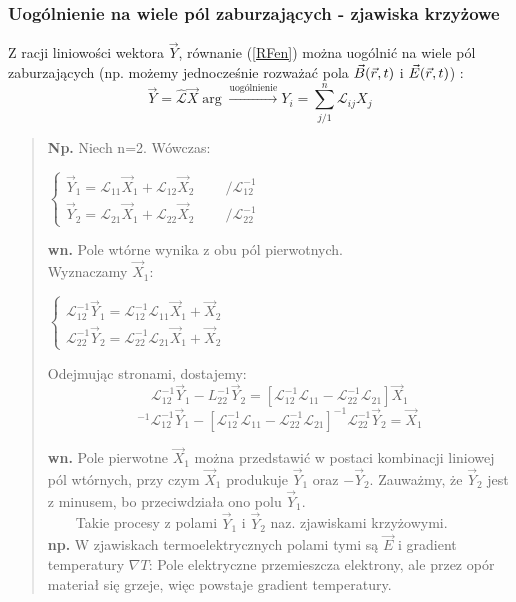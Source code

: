 \subsubsection{Uogólnienie na wiele pól zaburzających - zjawiska krzyżowe}
Z racji liniowości wektora $\vec{Y}$, równanie (\ref{RFen}) można uogólnić na wiele pól zaburzających (np. możemy jednocześnie rozważać pola $\vec{B}(\vec{r},t)$ i $\vec{E}(\vec{r},t)$) :
\begin{equation} \vec{Y}=\hat{\mathcal{L}}\vec{X} \arg 
\stackrel{\text{uogólnienie}}{\longrightarrow}  {Y}_i=\sum_{j/1}^n \mathcal{L}_{ij} X_j \end{equation}
\begin{verse} \textbf{Np.} Niech n=2. Wówczas:
\begin{center} 
$\begin{cases} \vec{Y}_1=\mathcal{L}_{11}\vec{X}_1+\mathcal{L}_{12}\vec{X}_2 ~~~~~~~~~~/\mathcal{L}_{12}^{-1}\\ \vec{Y}_2=\mathcal{L}_{21}\vec{X}_1+\mathcal{L}_{22}\vec{X}_2 ~~~~~~~~~~/\mathcal{L}_{22}^{-1}
\end{cases}$
\end{center}

\textbf{wn.} Pole wtórne wynika z obu pól pierwotnych.\\
Wyznaczamy $\vec{X}_1$:
\begin{center}
$\begin{cases} \mathcal{L}_{12}^{-1}\vec{Y}_1=\mathcal{L}_{12}^{-1}\mathcal{L}_{11}\vec{X}_1+\vec{X}_2 \\ \mathcal{L}_{22}^{-1}\vec{Y}_2=\mathcal{L}_{22}^{-1}\mathcal{L}_{21}\vec{X}_1+\vec{X}_2 
\end{cases}$
\end{center}
Odejmując stronami, dostajemy:
\begin{equation} \mathcal{L}_{12}^{-1}\vec{Y}_1 - {L}_{22}^{-1}\vec{Y}_2 = [\mathcal{L}_{12}^{-1}\mathcal{L}_{11} - \mathcal{L}_{22}^{-1}\mathcal{L}_{21}]\vec{X}_1 \nonumber \end{equation}
\begin{equation} 
 [\mathcal{L}_{12}^{-1}\mathcal{L}_{11}-\mathcal{L}_{22}^{-1}\mathcal{L}_{21}]^{-1} \mathcal{L}_{12}^{-1}\vec{Y}_1 -   
 [\mathcal{L}_{12}^{-1}\mathcal{L}_{11} - \mathcal{L}_{22}^{-1}\mathcal{L}_{21}]^{-1} \mathcal{L}_{22}^{-1}\vec{Y}_2 =\vec{X}_1  \nonumber \end{equation}
 
\textbf{wn.} Pole pierwotne $\vec{X}_1$ można przedstawić w postaci kombinacji liniowej pól wtórnych, przy czym $\vec{X}_1$ produkuje $\vec{Y}_1$ oraz $-\vec{Y}_2$. Zauważmy, że $\vec{Y}_2$ jest z minusem, bo przeciwdziała ono polu $\vec{Y}_1$.\\ ~~~~Takie procesy z polami $\vec{Y}_1$ i $\vec{Y}_2$ naz. zjawiskami krzyżowymi.\\
\textbf{np.} W zjawiskach termoelektrycznych polami tymi są $\vec{E}$ i gradient temperatury $\nabla T$: Pole elektryczne przemieszcza elektrony, ale przez opór materiał się grzeje, więc powstaje gradient temperatury.
\end{verse}
